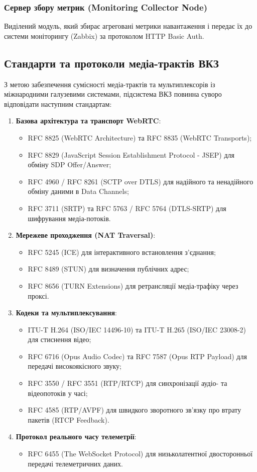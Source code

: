\documentclass{article}
\begin{document}
\subsubsection{Сервер збору метрик (Monitoring Collector Node)}
Виділений модуль, який збирає агреговані метрики навантаження і передає їх до системи моніторингу (Zabbix) за протоколом HTTP Basic Auth.

\subsection{Стандарти та протоколи медіа-трактів ВКЗ}
З метою забезпечення сумісності медіа-трактів та мультиплексорів із міжнародними галузевими системами, підсистема ВКЗ повинна суворо відповідати наступним стандартам:
\begin{enumerate}
    \item \textbf{Базова архітектура та транспорт WebRTC}:
    \begin{itemize}
        \item RFC 8825 (WebRTC Architecture) та RFC 8835 (WebRTC Transports);
        \item RFC 8829 (JavaScript Session Establishment Protocol - JSEP) для обміну SDP Offer/Answer;
        \item RFC 4960 / RFC 8261 (SCTP over DTLS) для надійного та ненадійного обміну даними в Data Channels;
        \item RFC 3711 (SRTP) та RFC 5763 / RFC 5764 (DTLS-SRTP) для шифрування медіа-потоків.
    \end{itemize}
    \item \textbf{Мережеве проходження (NAT Traversal)}:
    \begin{itemize}
        \item RFC 5245 (ICE) для інтерактивного встановлення з'єднання;
        \item RFC 8489 (STUN) для визначення публічних адрес;
        \item RFC 8656 (TURN Extensions) для ретрансляції медіа-трафіку через проксі.
    \end{itemize}
    \item \textbf{Кодеки та мультиплексування}:
    \begin{itemize}
        \item ITU-T H.264 (ISO/IEC 14496-10) та ITU-T H.265 (ISO/IEC 23008-2) для стиснення відео;
        \item RFC 6716 (Opus Audio Codec) та RFC 7587 (Opus RTP Payload) для передачі високоякісного звуку;
        \item RFC 3550 / RFC 3551 (RTP/RTCP) для синхронізації аудіо- та відеопотоків у часі;
        \item RFC 4585 (RTP/AVPF) для швидкого зворотного зв'язку про втрату пакетів (RTCP Feedback).
    \end{itemize}
    \item \textbf{Протокол реального часу телеметрії}:
    \begin{itemize}
        \item RFC 6455 (The WebSocket Protocol) для низьколатентної двосторонньої передачі телеметричних даних.
    \end{itemize}
\end{enumerate}
\end{document}
